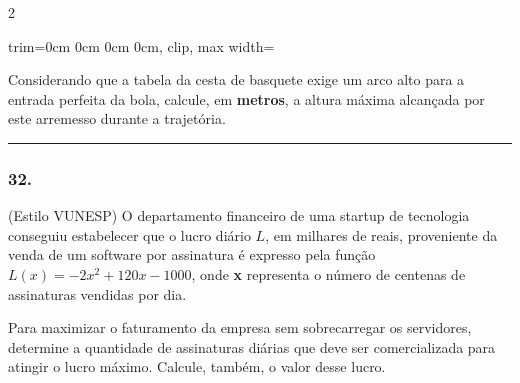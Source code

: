 \documentclass[twoside, 10pt, a4paper]{article}
\newlength{\espacoPreQuestao}
\newlength{\espacoQuestao}
\newlength{\larguraTikz}
\begin{document}
\begin{multicols*}{2}
\begin{center}
\begin{adjustbox}{trim=0cm 0cm 0cm 0cm, clip, max width=\larguraTikz}
\end{adjustbox}
\end{center}

Considerando que a tabela da cesta de basquete exige um arco alto para a entrada perfeita da bola, calcule, em \textbf{metros}, a altura máxima alcançada por este arremesso durante a trajetória.
\par\vspace{\espacoQuestao}

\noindent\textcolor{CorLinha}{\rule{\linewidth}{0.5pt}} 
\par\vspace{\espacoPreQuestao}
\subsubsection*{32.} (Estilo VUNESP) O departamento financeiro de uma startup de tecnologia conseguiu estabelecer que o lucro diário $L$, em milhares de reais, proveniente da venda de um software por assinatura é expresso pela função $L(x) = -2x^2 + 120x - 1000$, onde \textbf{x} representa o número de centenas de assinaturas vendidas por dia.

Para maximizar o faturamento da empresa sem sobrecarregar os servidores, determine a quantidade de assinaturas diárias que deve ser comercializada para atingir o lucro máximo. Calcule, também, o valor desse lucro.
\par\vspace{\espacoQuestao}


\end{multicols*}
\end{document}
